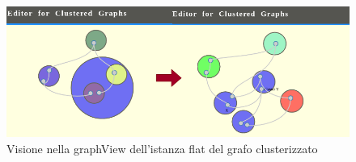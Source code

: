 {\begin{figure}[!htb]
	\begin{center}
		\includegraphics[width=0.9 \linewidth]{figure/graphAfterFlat}
	\end{center}
	\caption{Visione nella graphView dell'istanza flat del grafo clusterizzato\label{fig:graphAfterFlat}}
\end{figure} 
}